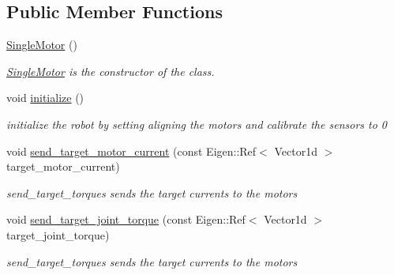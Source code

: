 \subsection*{Public Member Functions}
\begin{DoxyCompactItemize}
\item 
\hyperlink{classblmc__robots_1_1SingleMotor_a074ba2d9a982316a4aecac65b7c1b581}{Single\+Motor} ()
\begin{DoxyCompactList}\small\item\em \hyperlink{classblmc__robots_1_1SingleMotor}{Single\+Motor} is the constructor of the class. \end{DoxyCompactList}\item 
\mbox{\label{classblmc__robots_1_1SingleMotor_a2c547957aec36d6cbd02ead4882558d4}} 
void \hyperlink{classblmc__robots_1_1SingleMotor_a2c547957aec36d6cbd02ead4882558d4}{initialize} ()
\begin{DoxyCompactList}\small\item\em initialize the robot by setting aligning the motors and calibrate the sensors to 0 \end{DoxyCompactList}\item 
\mbox{\label{classblmc__robots_1_1SingleMotor_a2fa43cd18da7598b8a41da66ef9251ff}} 
void \hyperlink{classblmc__robots_1_1SingleMotor_a2fa43cd18da7598b8a41da66ef9251ff}{send\+\_\+target\+\_\+motor\+\_\+current} (const Eigen\+::\+Ref$<$ Vector1d $>$ target\+\_\+motor\+\_\+current)
\begin{DoxyCompactList}\small\item\em send\+\_\+target\+\_\+torques sends the target currents to the motors \end{DoxyCompactList}\item 
\mbox{\label{classblmc__robots_1_1SingleMotor_a09a829c726847cf4e8fd34175ce1a139}} 
void \hyperlink{classblmc__robots_1_1SingleMotor_a09a829c726847cf4e8fd34175ce1a139}{send\+\_\+target\+\_\+joint\+\_\+torque} (const Eigen\+::\+Ref$<$ Vector1d $>$ target\+\_\+joint\+\_\+torque)
\begin{DoxyCompactList}\small\item\em send\+\_\+target\+\_\+torques sends the target currents to the motors \end{DoxyCompactList}\item 

\end{DoxyCompactItemize}
